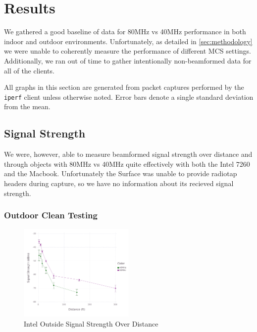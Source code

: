\section{Results}
We gathered a good baseline of data for 80MHz vs 40MHz performance in
both indoor and outdoor environments. Unfortunately, as detailed in
\ref{sec:methodology} we were unable to coherently measure the
performance of different MCS settings. Additionally, we ran out of
time to gather intentionally non-beamformed data for all of the
clients. 

All graphs in this section are generated from packet captures
performed by the \texttt{iperf} client unless otherwise noted. Error
bars denote a single standard deviation from the mean.

\subsection{Signal Strength}
We were, however, able to measure beamformed signal strength over
distance and through objects with 80MHz vs 40MHz quite effectively
with both the Intel 7260 and the Macbook. Unfortunately the Surface
was unable to provide radiotap headers during capture, so we have no
information about its recieved signal strength.

\tabcolsep=0.11cm



\subsubsection{Outdoor Clean Testing}

\begin{figure}[!h]
\centering
\includegraphics[width=0.5\textwidth]{figures/Intel_Outside_Beamformed}
\caption{Intel Outside Signal Strength Over Distance}
\label{fig:inteloutsidesignal}
\end{figure}

